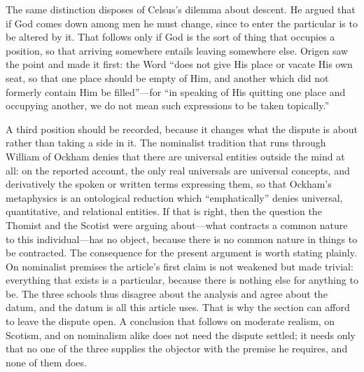 The same distinction disposes of Celsus's dilemma about descent. He argued that if God comes down among men he must change, since to enter the particular is to be altered by it. That follows only if God is the sort of thing that occupies a position, so that arriving somewhere entails leaving somewhere else. Origen saw the point and made it first: the Word ``does not give His place or vacate His own seat, so that one place should be empty of Him, and another which did not formerly contain Him be filled''---for ``in speaking of His quitting one place and occupying another, we do not mean such expressions to be taken topically.''

A third position should be recorded, because it changes what the dispute is about rather than taking a side in it. The nominalist tradition that runs through William of Ockham denies that there are universal entities outside the mind at all: on the reported account, the only real universals are universal concepts, and derivatively the spoken or written terms expressing them, so that Ockham's metaphysics is an ontological reduction which ``emphatically'' denies universal, quantitative, and relational entities. If that is right, then the question the Thomist and the Scotist were arguing about---what contracts a common nature to this individual---has no object, because there is no common nature in things to be contracted. The consequence for the present argument is worth stating plainly. On nominalist premises the article's first claim is not weakened but made trivial: everything that exists is a particular, because there is nothing else for anything to be. The three schools thus disagree about the analysis and agree about the datum, and the datum is all this article uses. That is why the section can afford to leave the dispute open. A conclusion that follows on moderate realism, on Scotism, and on nominalism alike does not need the dispute settled; it needs only that no one of the three supplies the objector with the premise he requires, and none of them does.

